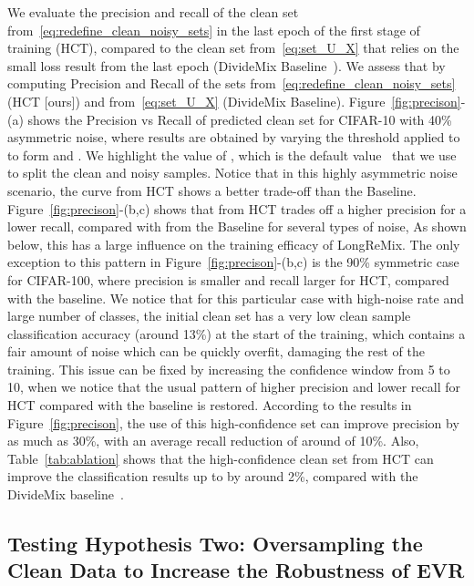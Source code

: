 \documentclass[review]{elsarticle}
\begin{document}
We evaluate the precision and recall of the clean set  from~\eqref{eq:redefine_clean_noisy_sets} in the last epoch of the first stage of training (HCT), 
compared to the clean set  from~\eqref{eq:set_U_X} that relies on the small loss result from the last epoch (DivideMix Baseline~\cite{li2020dividemix}). 
We assess that by computing Precision and Recall 
of the sets  from~\eqref{eq:redefine_clean_noisy_sets} (HCT [ours]) and  from~\eqref{eq:set_U_X} (DivideMix Baseline).
Figure~\ref{fig:precison}-(a) shows the Precision vs Recall of predicted clean set for CIFAR-10 with 40\% asymmetric noise, where results are obtained by varying the threshold  applied to   to form  and . 
We highlight the value of , which is the default value~\cite{li2020dividemix} that we use to split the clean and noisy samples. Notice that in this highly asymmetric noise scenario, the curve from HCT shows a better trade-off than the Baseline.
Figure~\ref{fig:precison}-(b,c) shows that  from HCT trades off a higher precision for a lower recall, compared with  from the Baseline for several types of noise,  As shown below, this has a large influence on the training efficacy of LongReMix. 
The only exception to this pattern in Figure~\ref{fig:precison}-(b,c) is the 90\% symmetric case for CIFAR-100, where precision is smaller and recall larger for HCT, compared with the baseline.  We notice that for this particular case with high-noise rate and large number of classes, the initial clean set has a very low clean sample classification accuracy (around 13\%) at the start of the training, which contains a fair amount of noise which can be quickly overfit, damaging the rest of the training.  This issue can be fixed by increasing the confidence window  from 5 to 10, when we notice that the usual pattern of higher precision and lower recall for HCT compared with the baseline is restored. According to the  results in Figure~\ref{fig:precison}, the use of this high-confidence set can improve precision by as much as 30\%, with an average recall reduction of around of 10\%.
Also, Table~\ref{tab:ablation} shows that the high-confidence clean set from HCT can improve the classification results up to by around 2\%, compared with the DivideMix baseline~\cite{li2020dividemix}. 


\subsection{Testing Hypothesis Two: Oversampling the Clean Data to Increase the Robustness of EVR}
\label{sec:hypothesis_two_empirical_results}
\end{document}
